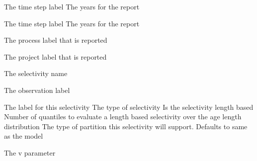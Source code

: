 \par\textbf{}\par
{} {The time step label}
 {The years for the report}
\par\textbf{}\par
{} {The time step label}
 {The years for the report}
\par\textbf{}\par
\par\textbf{}\par
{} {The process label that is reported}
\par\textbf{}\par
{} {The project label that is reported}
\par\textbf{}\par
\par\textbf{}\par
{} {The selectivity name}
\par\textbf{}\par
{} {The observation label}
\par\textbf{}\par
\par\textbf{}\par
{}\par\par
{} {The label for this selectivity}
 {The type of selectivity}
 {Is the selectivity length based}
 {Number of quantiles to evaluate a length based selectivity over the age length distribution}
 {The type of partition this selectivity will support. Defaults to same as the model}
 {}
 {}
\par\textbf{}\par
{} {The v parameter}
\par\textbf{}\par
